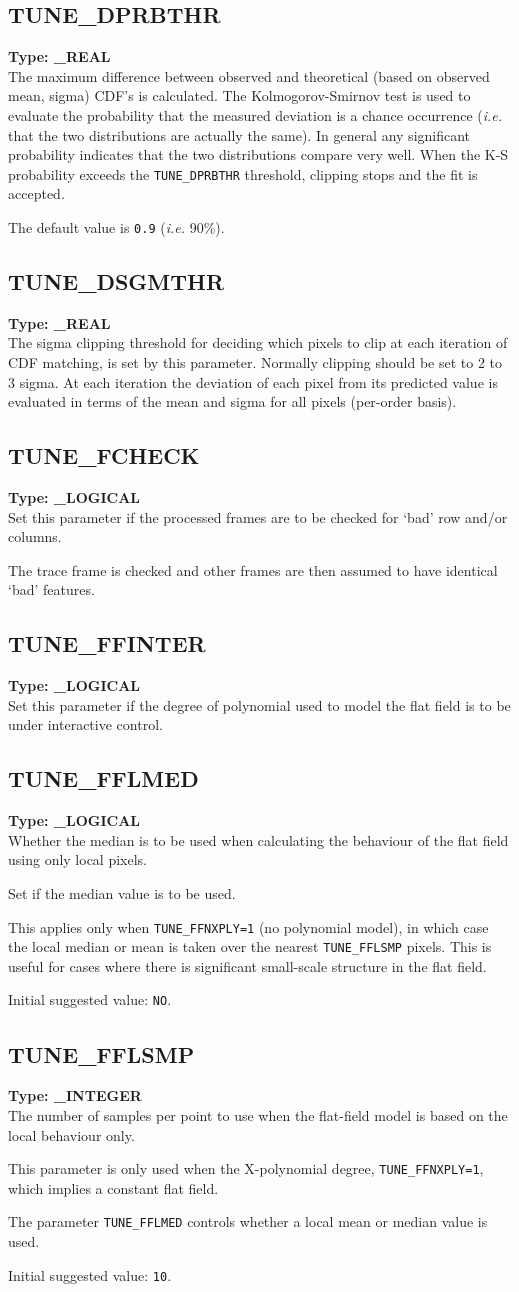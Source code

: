 \documentclass[11pt,twoside]{article}
\makeatletter
\newcommand{\htmlref}[2]{#1}
\newcommand{\xlabel}[1]{}
\newcommand{\indexcmdname}[1]{\index{#1@\protect\cmdname{#1}}}
\renewcommand{\indexcmdname}[1]{}
\newcommand{\cmdname}{\begingroup \catcode`\_=12 \realcmdname}
\newcommand{\realcmdname}[1]{\endgroup\texttt{#1}}
\newcommand{\echparameter}[4]
{
\item [#1 = #3] \mbox{}\label{par_#2}\indexcmdname{#2}
\\
#4
}
\renewcommand{\echparameter}[4]
{
  \subsection{\xlabel{par_#2}\label{par_#2}{\bf #1}}
  {\bf Type: #3}\\
#4
}
\makeatother
\begin{document}
\echparameter{TUNE\_DPRBTHR}{TUNE_DPRBTHR}{
 \_REAL
}{
 The maximum difference between observed and theoretical (based on
 observed mean, sigma) CDF's is calculated.  The Kolmogorov-Smirnov
 test is used to evaluate the probability that the measured
 deviation is a chance occurrence ({\it{i.e.}} that the two distributions are
 actually the same).  In general any significant probability
 indicates that the two distributions compare very well.  When the
 K-S probability exceeds the {\tt TUNE\_DPRBTHR} threshold, clipping stops
 and the fit is accepted.

 The default value is \texttt{0.9} ({\it{i.e.}} 90\%).
}

\echparameter{TUNE\_DSGMTHR}{TUNE_DSGMTHR}{
 \_REAL
}{
 The sigma clipping threshold for deciding which pixels to clip at
 each iteration of CDF matching, is set by this parameter.  Normally
 clipping should be set to 2 to 3 sigma.  At each iteration the
 deviation of each pixel from its predicted value is evaluated in
 terms of the mean and sigma for all pixels (per-order basis).
}

\echparameter{TUNE\_FCHECK}{TUNE_FCHECK}{
 \_LOGICAL
}{
 Set this parameter if the processed frames are to be
 checked for `bad' row and/or columns.

 The trace frame is checked and other frames are then assumed
 to have identical `bad' features.
}

\echparameter{TUNE\_FFINTER}{TUNE_FFINTER}{
 \_LOGICAL
}{
 Set this parameter if the degree of polynomial used to model the flat
 field is to be under interactive control.
}

\echparameter{TUNE\_FFLMED}{TUNE_FFLMED}{
 \_LOGICAL
}{
 Whether the median is to be used when calculating the
 behaviour of the flat field using only local pixels.

 Set if the median value is to be used.

 This applies only when
 \htmlref{{\tt TUNE\_FFNXPLY=1}}{par_TUNE_FFNXPLY} (no polynomial model), in
 which case the local median or mean is taken over the nearest
 \htmlref{{\tt TUNE\_FFLSMP}}{par_TUNE_FFLSMP} pixels.
 This is useful for cases where there is
 significant small-scale structure in the flat field.

 Initial suggested value: \texttt{NO}.
}

\echparameter{TUNE\_FFLSMP}{TUNE_FFLSMP}{
 \_INTEGER
}{
 The number of samples per point to use when the flat-field model
 is based on the local behaviour only.

 This parameter is only used when the X-polynomial degree,
 \htmlref{{\tt TUNE\_FFNXPLY=1}}{par_TUNE_FFNXPLY},
 which implies a constant flat field.

 The parameter \htmlref{{\tt TUNE\_FFLMED}}{par_TUNE_FFLMED}
 controls whether a local mean or median value is used.

 Initial suggested value: \texttt{10}.
}
\end{document}

